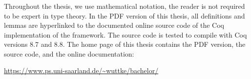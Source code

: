 Throughout the thesis, we use mathematical notation, the reader is not required to be expert in type theory.  In the PDF version of this thesis, all
definitions and lemmas are hyperlinked to the documented online source code of the Coq implementation of the framework.  The source code is tested to
compile with Coq versions 8.7 and 8.8.  The home page of this thesis contains the PDF version, the source code, and the online documentation:
\begin{center}
  \url{https://www.ps.uni-saarland.de/~wuttke/bachelor/}
\end{center}

